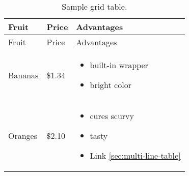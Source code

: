 \documentclass[
  12pt,
  british,
  a4paper,
  twoside,
  titlepage,
  openright,
  numbers=noenddot,
  chapterprefix=true,
  headings=optiontohead,
  svgnames,
  dvipsnames]{scrreprt}
\providecommand{\tightlist}{%
  \setlength{\itemsep}{0pt}\setlength{\parskip}{0pt}}
\begin{document}
\begin{longtable}[]{@{}lll@{}}
\caption{Sample grid table.}\tabularnewline
\toprule
\begin{minipage}[b]{0.18\columnwidth}\raggedright
Fruit\strut
\end{minipage} & \begin{minipage}[b]{0.09\columnwidth}\raggedright
Price\strut
\end{minipage} & \begin{minipage}[b]{0.24\columnwidth}\raggedright
Advantages\strut
\end{minipage}\tabularnewline
\midrule
\endfirsthead
\toprule
\begin{minipage}[b]{0.18\columnwidth}\raggedright
Fruit\strut
\end{minipage} & \begin{minipage}[b]{0.09\columnwidth}\raggedright
Price\strut
\end{minipage} & \begin{minipage}[b]{0.24\columnwidth}\raggedright
Advantages\strut
\end{minipage}\tabularnewline
\midrule
\endhead
\begin{minipage}[t]{0.18\columnwidth}\raggedright
Bananas\strut
\end{minipage} & \begin{minipage}[t]{0.09\columnwidth}\raggedright
\$1.34\strut
\end{minipage} & \begin{minipage}[t]{0.24\columnwidth}\raggedright
\begin{itemize}
\tightlist
\item
  built-in wrapper
\item
  bright color
\end{itemize}\strut
\end{minipage}\tabularnewline
\begin{minipage}[t]{0.18\columnwidth}\raggedright
Oranges\strut
\end{minipage} & \begin{minipage}[t]{0.09\columnwidth}\raggedright
\$2.10\strut
\end{minipage} & \begin{minipage}[t]{0.24\columnwidth}\raggedright
\begin{itemize}
\tightlist
\item
  cures scurvy
\item
  tasty
\item
  Link \cref{sec:multi-line-table}
\end{itemize}\strut
\end{minipage}\tabularnewline
\bottomrule
\end{longtable}
\end{document}
